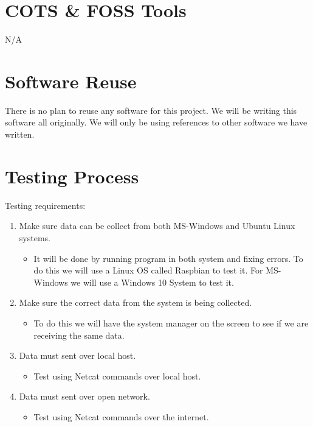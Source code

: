 \documentclass[letterpaper,12pt,oneside,listof=totoc]{scrreprt}
\begin{document}
\section{COTS \& FOSS Tools}

N/A

\section{Software Reuse}
There is no plan to reuse any software for this project. We will be writing this software all originally. We will only be using references to other software we have written.

\section{Testing Process}
Testing requirements: 
\begin{enumerate}

\item  Make sure data can be collect from both MS-Windows and Ubuntu Linux
systems. 
    \begin{itemize}
    \item It will be done by running program in both system and fixing errors. To do this we will use a Linux OS called Raspbian to test it. For MS-Windows we will use a Windows 10 System to test it.
    \end{itemize}
    
\item  Make sure the correct data from the system is being collected. 
    \begin{itemize}
    \item To do this we will have the system manager on the screen to see if we are receiving the same data.
    \end{itemize}
    
\item  Data must sent over local host. 
    \begin{itemize}
    \item Test using Netcat commands over local host.
    \end{itemize}
    
\item  Data must sent over open network. 
    \begin{itemize}
    \item Test using Netcat commands over the internet.
    \end{itemize}

\end{enumerate}
\end{document}
